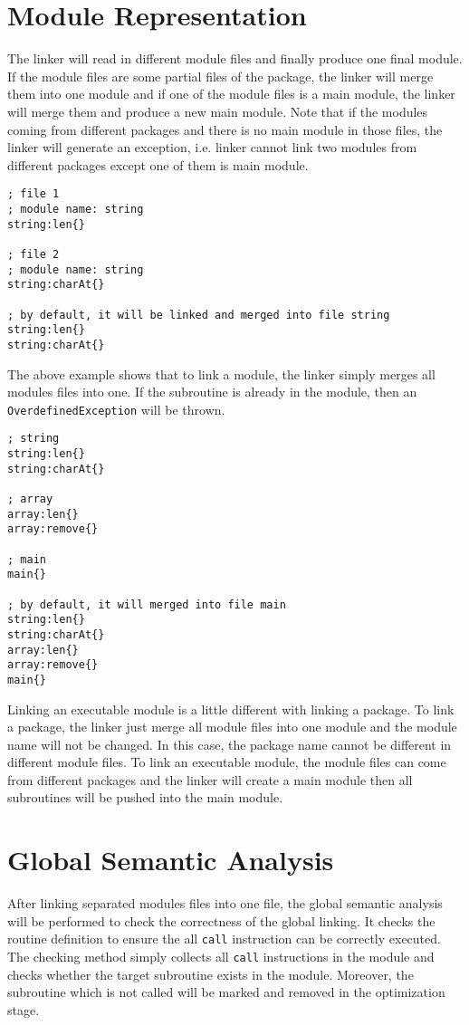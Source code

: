 \section{Module Representation}
The linker will read in different module files and finally produce one final module. If the module files are some partial files of the package, the linker will merge them into one module and if one of the module files is a main module, the linker will merge them and produce a new main module. Note that if the modules coming from different packages and there is no main module in those files, the linker will generate an exception, i.e. linker cannot link two modules from different packages except one of them is main module.
\begin{lstlisting}[language=LucyX]
; file 1
; module name: string
string:len{}

; file 2
; module name: string
string:charAt{}

; by default, it will be linked and merged into file string
string:len{}
string:charAt{}
\end{lstlisting}
The above example shows that to link a module, the linker simply merges all modules files into one. If the subroutine is already in the module, then an \texttt{OverdefinedException} will be thrown.
\begin{lstlisting}[language=LucyX]
; string
string:len{}
string:charAt{}

; array
array:len{}
array:remove{}

; main
main{}

; by default, it will merged into file main
string:len{}
string:charAt{}
array:len{}
array:remove{}
main{}
\end{lstlisting}
Linking an executable module is a little different with linking a package. To link a package, the linker just merge all module files into one module and the module name will not be changed. In this case, the package name cannot be different in different module files. To link an executable module, the module files can come from different packages and the linker will create a main module then all subroutines will be pushed into the main module.

\section{Global Semantic Analysis}
After linking separated modules files into one file, the global semantic analysis will be performed to check the correctness of the global linking. It checks the routine definition to ensure the all \texttt{call} instruction can be correctly executed. \\
The checking method simply collects all \texttt{call} instructions in the module and checks whether the target subroutine exists in the module. Moreover, the subroutine which is not called will be marked and removed in the optimization stage.
